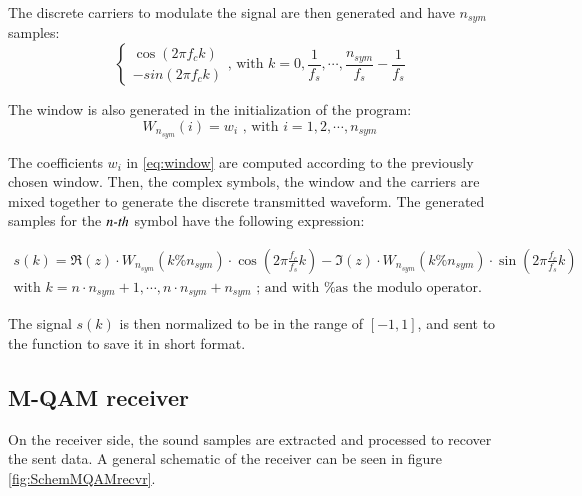 \documentclass[12pt,a4paper,openright]{report}
\begin{document}
 The discrete carriers to modulate the signal are then generated and have $n_{sym}$ samples:
\begin{equation}
\left\{ \begin{array}{l}
\cos (2\pi f_ck)\\
 - sin(2\pi f_ck)
\end{array} \right.\text{, with }  k = 0,\frac{1}{{f_s}},\cdots,\frac{{n_{sym}}}{{f_s}} - \frac{1}{{f_s}}
\label{eq:MQAMdiscCarriers}
\end{equation}

The window is also generated in the initialization of the program:
\begin{equation}\label{eq:window}
W_{n_{sym}}(i) = w_i\text{ , with }i = 1,2,\cdots,n_{sym}
\end{equation}

 The coefficients $w_i$ in \ref{eq:window} are computed according to the previously chosen window. Then, the complex symbols, the window and the carriers are mixed together to generate the discrete transmitted waveform. The generated samples for the $\emph{n-th}$ symbol have the following expression:

\begin{equation}\begin{array}{l}
s(k) = \Re (z) \cdot {W_{{n_{sym}}}}(k\% {n_{sym}}) \cdot \cos (2\pi \frac{{{f_c}}}{{{f_s}}}k) - \Im (z) \cdot {W_{{n_{sym}}}}(k\% {n_{sym}}) \cdot \sin (2\pi \frac{{{f_c}}}{{{f_s}}}k)\\
\text{with $k = n \cdot n_{sym} + 1,\cdots,n \cdot n_{sym}+ n_{sym}$ ; and with \% as the modulo operator.} 
\end{array}\end{equation}

The signal $s(k)$ is then normalized to be in the range of $[-1,1]$, and sent to the function to save it in short format. 

\subsection{M-QAM receiver}

On the receiver side, the sound samples are extracted and processed to recover the sent data. A general schematic of the receiver can be seen in figure \ref{fig:SchemMQAMrecvr}.
\end{document}
